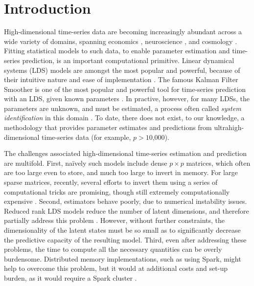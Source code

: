 \documentclass[fleqn,12pt]{article}
\newcommand{\mrsid}{{\sc \texttt{Mr}.~\texttt{Sid}}}
\begin{document}
\section{Introduction}

High-dimensional time-series data are becoming increasingly abundant across a wide variety of domains, spanning economics \citep{Johansen1988}, neuroscience \citep{Friston2003a},   and cosmology \citep{Xie2013a}.
Fitting statistical models to such data, to enable parameter estimation and time-series prediction, is an important computational primitive.
Linear dynamical systems (LDS) models are amongst the most popular and powerful, because of their intuitive nature and ease of implementation \citep{Kalman1963}.   The famous Kalman Filter Smoother is one of the most popular and powerful tool for time-series prediction with an LDS, given known parameters \citep{Kalman1960a}.
In practive, however, for many LDSs, the parameters are unknown, and must be estimated, a process often called \emph{system identification} in this domain \citep{Ljung1998}.  To date, there does not exist, to our knowledge, a methodology that provides parameter estimates and predictions from ultrahigh-dimensional time-series data (for example, $p > 10$,$000$).

The challenges associated high-dimensional time-series estimation and prediction are multifold.  First, na\"{i}vely such models include dense $p \times p$ matrices, which often are too large even to store, and much too large to invert in memory.  For large sparse matrices, recently, several efforts to invert them using a series of computational tricks are promising, though still extremely computationally expensive  \citep{Hsieh2013, Banerjee2013a}.
Second, estimators behave poorly, due to numerical instability issues.
Reduced rank LDS models reduce the number of latent dimensions, and therefore partially address this problem \citep{CHEN1989}.  However, without further constraints, the dimensionality of the latent states must be so small as to significantly decrease the predictive capacity of the resulting model.  Third, even after addressing these problems, the time to compute all the necessary quantities can be overly burdensome. Distributed memory implementations, such as using Spark, might help to overcome this problem, but it would at additional costs and set-up burden, as it would require a Spark cluster \citep{Zaharia2010}.
\end{document}
